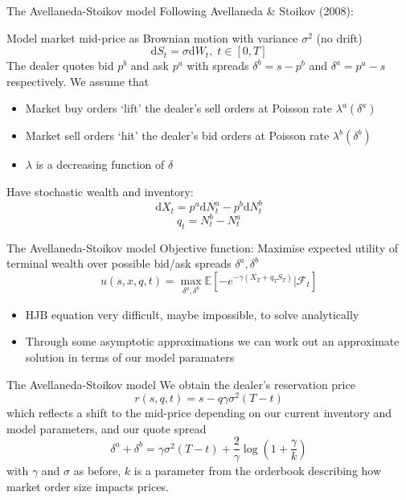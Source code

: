 \documentclass{beamer} %
\begin{document}
\begin{frame}{The Avellaneda-Stoikov model}
    Following Avellaneda \& Stoikov (2008):

    Model market mid-price as Brownian motion with variance $\sigma^2$ (no drift)
    $$\mathrm d S_t=\sigma \mathrm d W_t,\;t\in[0,T]$$
    The dealer quotes bid $p^b$ and ask $p^a$ with spreads $\delta^b=s-p^b$ and $\delta^a=p^a-s$
    respectively.
    We assume that 
    \begin{itemize}
        \item Market buy orders `lift' the dealer's sell orders at Poisson rate $\lambda^a(\delta^a)$
        \item Market sell orders `hit' the dealer's bid orders at Poisson rate $\lambda^b(\delta^b)$
        \item $\lambda$ is a decreasing function of $\delta$
    \end{itemize}
    Have stochastic wealth and inventory:
    \begin{equation}
        \mathrm dX_t=p^a\mathrm dN_t^a-p^b\mathrm dN_t^b
    \end{equation}
    \begin{equation}
        q_t=N_t^b-N_t^a
    \end{equation}
\end{frame}

\begin{frame}{The Avellaneda-Stoikov model}
    Objective function: Maximise expected utility of terminal wealth over possible bid/ask spreads $\delta^a,\delta^b$
    \begin{equation}
        u(s,x,q,t)=\max_{\delta^a,\delta^b}\mathbb{E}\left[-e^{-\gamma(X_T+q_TS_T)}|\mathcal{F}_t\right]
    \end{equation}
    \begin{itemize}
        \item HJB equation very difficult, maybe impossible, to solve analytically
        \item Through some asymptotic approximations we can work out an approximate solution in terms of our model paramaters
    \end{itemize}
\end{frame}

\begin{frame}{The Avellaneda-Stoikov model}
    We obtain the dealer's reservation price
    \begin{equation}
        r(s,q,t)=s-q\gamma\sigma^2(T-t)
    \end{equation}
    which reflects a shift to the mid-price depending on our current inventory and model parameters, and our quote spread
    \begin{equation}
        \delta^a+\delta^b=\gamma\sigma^2(T-t)+\frac{2}{\gamma}\log\left(1+\frac{\gamma}{k}\right)
    \end{equation}
    with $\gamma$ and $\sigma$ as before, $k$ is a parameter from the orderbook describing how 
    market order size impacts prices.
\end{frame}
\end{document}
